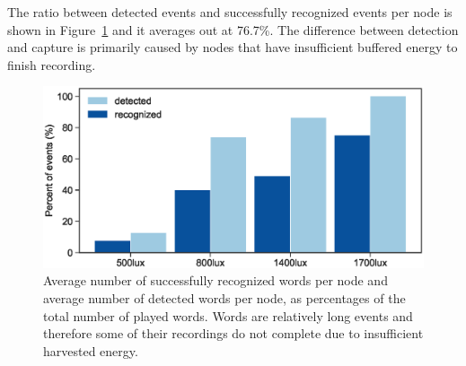 The ratio between detected events and successfully recognized events per node is shown in Figure~\ref{fig:word_freq} and it averages out at  76.7\%. The difference between detection and capture is primarily caused by nodes that have insufficient buffered energy to finish recording.  

%
\begin{figure}
\centering
\includegraphics[width=\linewidth]{figures/detection_vs_recognition}
\caption{
Average number of successfully recognized words per node and average number of detected words per node, as percentages of the total number of played words. Words are relatively long events and therefore some of their recordings do not complete due to insufficient harvested energy.}
\label{fig:word_freq}
\end{figure}










































